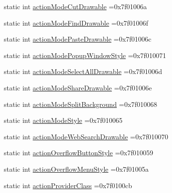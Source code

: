 \begin{DoxyCompactItemize}
static int \hyperlink{classandroid_1_1support_1_1graphics_1_1drawable_1_1animated_1_1R_1_1attr_a68920171230f112599102cd498e43f7b}{action\+Mode\+Cut\+Drawable} =0x7f01006a
\item 
static int \hyperlink{classandroid_1_1support_1_1graphics_1_1drawable_1_1animated_1_1R_1_1attr_ab7ee719feb287059beae1884e8b2a091}{action\+Mode\+Find\+Drawable} =0x7f01006f
\item 
static int \hyperlink{classandroid_1_1support_1_1graphics_1_1drawable_1_1animated_1_1R_1_1attr_abef75b82324d9307b467d85ef8adfb42}{action\+Mode\+Paste\+Drawable} =0x7f01006c
\item 
static int \hyperlink{classandroid_1_1support_1_1graphics_1_1drawable_1_1animated_1_1R_1_1attr_aaf21ca4a5ddbc15ffd8373de8e32fe23}{action\+Mode\+Popup\+Window\+Style} =0x7f010071
\item 
static int \hyperlink{classandroid_1_1support_1_1graphics_1_1drawable_1_1animated_1_1R_1_1attr_af5e3d6f4671eb80f78c961c40b708435}{action\+Mode\+Select\+All\+Drawable} =0x7f01006d
\item 
static int \hyperlink{classandroid_1_1support_1_1graphics_1_1drawable_1_1animated_1_1R_1_1attr_aa2c7439ee6bbdcf5f4f26dd3d74646bc}{action\+Mode\+Share\+Drawable} =0x7f01006e
\item 
static int \hyperlink{classandroid_1_1support_1_1graphics_1_1drawable_1_1animated_1_1R_1_1attr_a72ab4e1e363beef672a529a20c89e8f1}{action\+Mode\+Split\+Background} =0x7f010068
\item 
static int \hyperlink{classandroid_1_1support_1_1graphics_1_1drawable_1_1animated_1_1R_1_1attr_ad1d8d34cab9d73f6e4a1a4151d6a2403}{action\+Mode\+Style} =0x7f010065
\item 
static int \hyperlink{classandroid_1_1support_1_1graphics_1_1drawable_1_1animated_1_1R_1_1attr_aeaf5dcc21d1ad83062af223a7a80fc3b}{action\+Mode\+Web\+Search\+Drawable} =0x7f010070
\item 
static int \hyperlink{classandroid_1_1support_1_1graphics_1_1drawable_1_1animated_1_1R_1_1attr_ae32c32b6f4d0b33ed22b2c94af0c7843}{action\+Overflow\+Button\+Style} =0x7f010059
\item 
static int \hyperlink{classandroid_1_1support_1_1graphics_1_1drawable_1_1animated_1_1R_1_1attr_afc43a52a8a21350445c89de3287e5d8d}{action\+Overflow\+Menu\+Style} =0x7f01005a
\item 
static int \hyperlink{classandroid_1_1support_1_1graphics_1_1drawable_1_1animated_1_1R_1_1attr_a5cf52dc49c7a13447e6ea9a12b6afc16}{action\+Provider\+Class} =0x7f0100cb
\item 

\end{DoxyCompactItemize}
